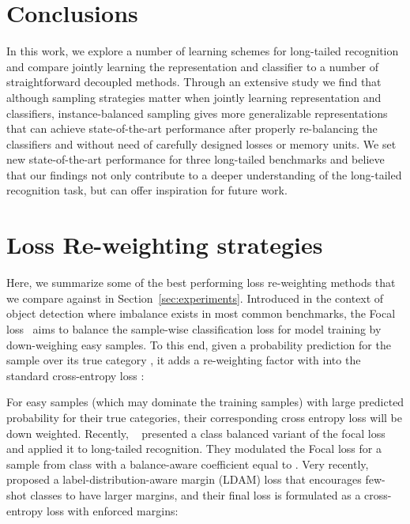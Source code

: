 \documentclass[dvipsnames]{article} \usepackage{iclr2020_conference, times}
\newcommand{\uniform}{instance-balanced\xspace}
\begin{document}
 

\section{Conclusions}
\label{sec:conclusions}


In this work, we explore a number of learning schemes for long-tailed recognition and compare jointly learning the representation and classifier to a number of straightforward decoupled methods. Through an extensive study we find that although sampling strategies matter when jointly learning representation and classifiers, \uniform sampling gives more generalizable representations that can achieve state-of-the-art performance after properly re-balancing the classifiers and without need of carefully designed losses or memory units. We set new state-of-the-art performance for three long-tailed benchmarks and believe that our findings not only contribute to a deeper understanding of the long-tailed recognition task, but can offer inspiration for future work.  








\newpage
\appendix



\section{Loss Re-weighting strategies}
\label{sec:reweighting}


Here, we summarize some of the best performing loss re-weighting methods that we compare against in Section~\ref{sec:experiments}. Introduced in the context of object detection where imbalance exists in most common benchmarks, the Focal loss~\citep{lin2017focal} aims to balance the sample-wise classification loss for model training by down-weighing easy samples. To this end, given a probability prediction  for the sample  over its true category , it adds a re-weighting factor   with  into the standard cross-entropy loss : 

For easy samples (which may dominate the training samples) with large predicted probability  for their true categories, their corresponding cross entropy loss will be down weighted. Recently, ~\citet{cui2019class} presented a class balanced variant of the focal loss and applied it to long-tailed recognition. They modulated the Focal loss for a sample from class  with a balance-aware coefficient equal to . Very recently, \citet{cao2019learning} proposed a label-distribution-aware margin (LDAM) loss that encourages few-shot classes to have larger margins, and their final loss is formulated as a cross-entropy loss with enforced margins:
\end{document}
